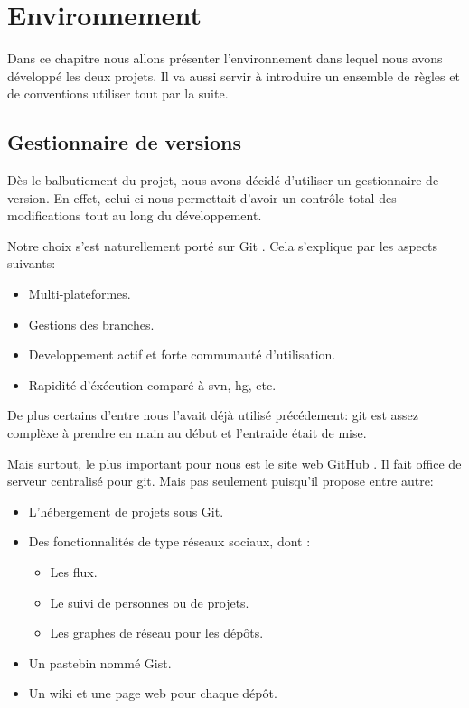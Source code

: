 \chapter{Environnement}
    Dans ce chapitre nous allons présenter l'environnement dans lequel nous avons
    développé les deux projets. Il va aussi servir à introduire un ensemble de
    règles et de conventions utiliser tout par la suite.

\newpage

    \section{Gestionnaire de versions}
        Dès le balbutiement du projet, nous avons décidé d'utiliser un gestionnaire
    de version. En effet, celui-ci nous permettait d'avoir un contrôle total des modifications
    tout au long du développement.

    Notre choix s'est naturellement porté sur Git \cite{git}. Cela s'explique 
    par les aspects suivants:

    \begin{itemize}
    \item Multi-plateformes.
    \item Gestions des branches.
    \item Developpement actif et forte communauté d'utilisation.
    \item Rapidité d'éxécution comparé à svn, hg, etc. 
    \end{itemize}

    De plus certains d'entre nous l'avait déjà utilisé précédement: git est assez
    complèxe à prendre en main au début et l'entraide était de mise.

    Mais surtout, le plus important pour nous est le site web GitHub \cite{github}.
    Il fait office de serveur centralisé pour git. Mais pas seulement puisqu'il 
    propose entre autre:

    \begin{itemize}
    \item L'hébergement de projets sous Git.
    \item Des fonctionnalités de type réseaux sociaux, dont :
        \begin{itemize}
        \item Les flux.
        \item Le suivi de personnes ou de projets.
        \item Les graphes de réseau pour les dépôts.
        \end{itemize}
    \item Un pastebin nommé Gist.
    \item Un wiki et une page web pour chaque dépôt.
    \end{itemize}

